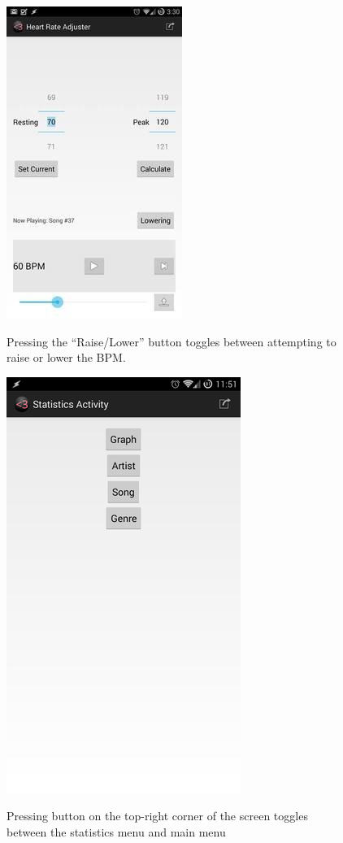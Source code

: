 \documentclass[letterpaper,english, 12pt]{scrreprt}
\begin{document}
\begin{figure}[H]
	\centering
	\includegraphics{img/mobile_ui/2.png}\\
	\caption{Pressing the ``Raise/Lower'' button toggles between attempting to raise or lower the BPM.}
\end{figure}

\begin{figure}[H]
	\centering
	\includegraphics{img/mobile_ui/3.png}\\
	\caption{Pressing button on the top-right corner of the screen toggles between the statistics menu and main menu}
\end{figure}
\end{document}
